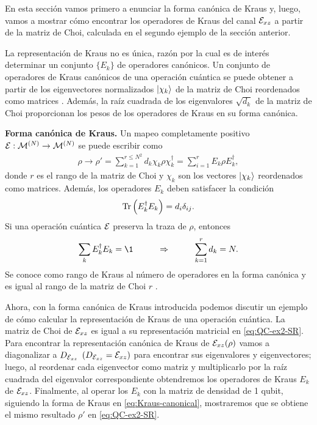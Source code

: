 En esta sección vamos primero a enunciar la forma canónica
de Kraus y, luego, vamos a mostrar cómo encontrar los 
operadores de Kraus del canal $\mathcal{E}_{xz}$ a partir de la 
matriz de Choi, calculada en el segundo ejemplo de la 
sección anterior.


La representación de Kraus no es única, razón por la cual es de interés
determinar un conjunto $\{E_k\}$ de operadores canónicos.
 
Un conjunto de operadores de Kraus canónicos de una 
operación cuántica se puede obtener a partir de los 
eigenvectores normalizados $\ket{\chi_k}$ de la 
matriz de Choi reordenados como matrices \cite{bengtsson_zyczkowski_2017}.
Además, la raíz cuadrada de los eigenvalores $\sqrt{d_k}$ de la 
matriz de Choi proporcionan los pesos de los operadores
de Kraus en su forma canónica.  

\textbf{Forma canónica de Kraus.} Un mapeo completamente 
positivo $\mathcal{E}:\mathcal{M}^{(N)}\to\mathcal{M}^{(N)}$ se
puede escribir como
\begin{align}
\rho \longrightarrow \rho' = 
\sum_{k=1}^{r\leq N^2}d_k\chi_k\rho\chi_k^{\dagger}
= \sum_{i=1}^rE_k\rho E_k^{\dagger},
\label{eq:Kraus-canonical}
\end{align}
donde $r$ es el rango de la matriz de Choi y $\chi_k$ 
son los vectores $\ket{\chi_k}$ reordenados como matrices.
Además, los operadores $E_k$ deben satisfacer la condición
\begin{align}
  \Tr\qty(E_k^{\dagger}E_k)=d_i\delta_{ij}.
  \label{eq:Tr-Kraus-canonical}
\end{align}
Si una operación cuántica $\mathcal{E}$ preserva la traza de $\rho$, entonces
\begin{align}
  \sum_kE_k^{\dagger}E_k=\1
  \hspace{1cm}\Rightarrow\hspace{1cm}
  \sum_{k=1}^rd_k=N .
  \label{eq:completeness-Kraus-canonical}
\end{align}
Se conoce como rango de Kraus al número de operadores 
en la forma canónica y es igual al rango de la matriz de Choi $r$
\cite{bengtsson_zyczkowski_2017}.

Ahora, con la forma canónica de Kraus introducida podemos
discutir un ejemplo de cómo calcular la representación de Kraus
de una operación cuántica.
La matriz de Choi de $\mathcal{E}_{xz}$ es igual a  su representación
matricial en \eqref{eq:QC-ex2-SR}.
Para encontrar la representación canónica de Kraus de $\mathcal{E}_{xz}\qty(\rho)$
vamos a diagonalizar a $D_{\mathcal{E}_{xz}}$ $(D_{\mathcal{E}_{xz}}=\mathcal{E}_{xz})$
para encontrar
sus eigenvalores y eigenvectores; luego, al reordenar
cada eigenvector como matriz y multiplicarlo por la raíz cuadrada
del eigenvalor correspondiente obtendremos los operadores 
de Kraus $E_k$ de $\mathcal{E}_{xz}$. Finalmente, al operar los $E_k$ 
con la matriz de densidad de 1 qubit, siguiendo la forma de 
Kraus en \eqref{eq:Kraus-canonical}, mostraremos que se obtiene el 
mismo resultado $\rho'$ en \eqref{eq:QC-ex2-SR}.


